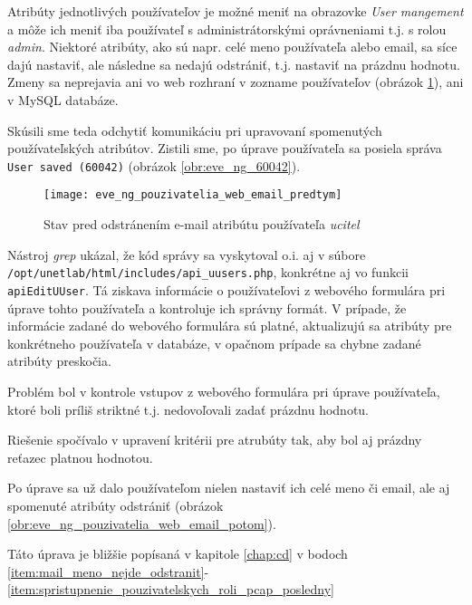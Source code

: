 Atribúty jednotlivých používateľov je možné meniť na obrazovke \emph{User mangement} a môže ich meniť iba používateľ s administrátorskými oprávneniami t.j. s rolou \emph{admin}. Niektoré atribúty, ako sú napr. celé meno používateľa alebo email, sa síce dajú nastaviť, ale následne sa nedajú odstrániť, t.j. nastaviť na prázdnu hodnotu. Zmeny sa neprejavia ani vo web rozhraní v zozname používateľov (obrázok \ref{obr:eve_ng_pouzivatelia_web_email_predtym}), ani v MySQL databáze.

\begin{figure}
    
\end{figure}

Skúsili sme teda odchytiť komunikáciu pri upravovaní spomenutých používateľských atribútov. Zistili sme, po úprave používateľa sa posiela správa \texttt{User saved (60042)} (obrázok \ref{obr:eve_ng_60042}).

\begin{figure}
    \centering
    \texttt{[image: eve\_ng\_pouzivatelia\_web\_email\_predtym]}
    \caption{Stav pred odstránením e-mail atribútu používateľa \emph{ucitel}}
    \label{obr:eve_ng_pouzivatelia_web_email_predtym}
\end{figure}

Nástroj \emph{grep} ukázal, že kód správy sa vyskytoval o.i. aj v súbore \\
\texttt{/opt/unetlab/html/includes/api\_uusers.php}, konkrétne aj vo funkcii \texttt{apiEditUUser}. Tá ziskava informácie o používateľovi z webového formulára pri úprave tohto používateľa a kontroluje ich správny formát. V prípade, že informácie zadané do webového formulára sú platné, aktualizujú sa atribúty pre konkrétneho používateľa v databáze, v opačnom prípade sa chybne zadané atribúty preskočia.

Problém bol v kontrole vstupov z webového formulára pri úprave používateľa, ktoré boli príliš striktné t.j. nedovoľovali zadať prázdnu hodnotu.

Riešenie spočívalo v upravení kritérii pre atrubúty tak, aby bol aj prázdny reťazec platnou hodnotou.

Po úprave sa už dalo používateľom nielen nastaviť ich celé meno či email, ale aj spomenuté atribúty odstrániť (obrázok \ref{obr:eve_ng_pouzivatelia_web_email_potom}).

Táto úprava je bližšie popísaná v kapitole \ref{chap:cd} v bodoch \ref{item:mail_meno_nejde_odstranit}-\ref{item:spristupnenie_pouzivatelskych_roli_pcap_posledny}

